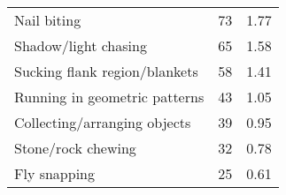 \documentclass[varwidth=\maxdimen]{standalone}
\newcommand{\subrow}[1]{\hspace{1.25em}#1}
\begin{document}
\begin{tabular}[t]{lrr}
  \subrow{Nail biting}                         &       73 &            1.77 \\
  \subrow{Shadow/light chasing}                &       65 &            1.58 \\
  \subrow{Sucking flank region/blankets}       &       58 &            1.41 \\
  \subrow{Running in geometric patterns}       &       43 &            1.05 \\
  \subrow{Collecting/arranging objects}        &       39 &            0.95 \\
  \subrow{Stone/rock chewing}                  &       32 &            0.78 \\
  \subrow{Fly snapping}                        &       25 &            0.61 \\
\bottomrule
\end{tabular}
\end{document}
